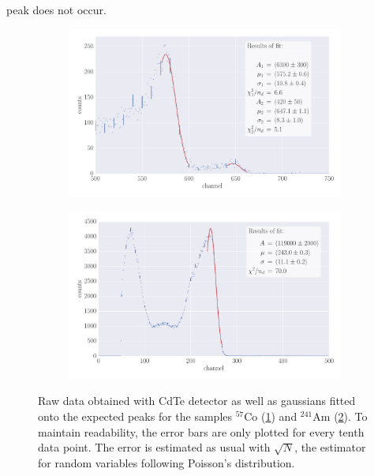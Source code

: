 peak does not occur. 
\begin{figure}
    \centering
    \begin{subfigure}[b]{\pltw}
        \includegraphics[width=1.0\linewidth]{figures/detector_Co_CdTe}
        \caption{}
        \label{fig:detector_Co_CdTe}
    \end{subfigure}
    \begin{subfigure}[b]{\pltw}
        \includegraphics[width=1.0\linewidth]{figures/detector_Am_CdTe}
        \caption{}
        \label{fig:detector_Am_CdTe}
    \end{subfigure}
    \caption{
        Raw data obtained with CdTe detector as well as gaussians fitted 
        onto the expected peaks for the samples $^{57}$Co (\ref{fig:detector_Co_CdTe})
        and $^{241}$Am (\ref{fig:detector_Am_CdTe}). To maintain readability, the error bars 
        are only plotted for every tenth data point. The error is estimated as usual 
        with $\sqrt{N}$, the estimator for random variables following Poisson's distribution. 
        }
    \label{fig:detector_CdTe}
\end{figure}

